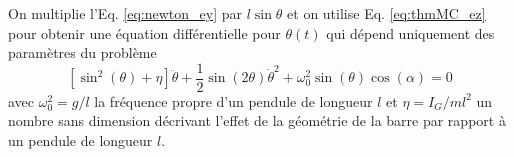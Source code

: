 \par\vspace{2mm}
On multiplie l'Eq. \eqref{eq:newton_ey} par $l\sin\theta$ et on utilise Eq. \eqref{eq:thmMC_ez} pour obtenir une équation différentielle pour $\theta(t)$ qui dépend uniquement des paramètres du problème
\begin{equation}
    \left[\sin^2(\theta) +\eta\right]\ddot\theta +\frac{1}{2}\sin(2\theta)\dot\theta^2 + \omega_0^2\sin(\theta) \cos(\alpha) = 0 \label{eq:Eqdumvt}
\end{equation}
avec $\omega_0^2=g/l$ la fréquence propre d'un pendule de longueur $l$ et $\eta=I_G/ml^2$ un nombre sans dimension décrivant l'effet de la géométrie de la barre par rapport à un pendule de longueur $l$. 
